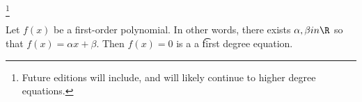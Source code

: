 
\footnote{Future editions will include, and will likely continue to higher degree equations.}


Let $f(x)$ be a first-order polynomial.
In other words, there exists $\alpha, \beta in \R$ so that $f(x) = \alpha x + \beta$.
Then $f(x) = 0$ is a a \t{first degree equation}.

\blankpage
